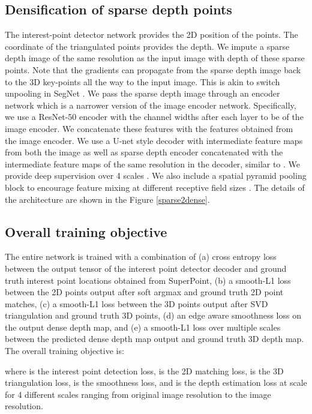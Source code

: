 \documentclass[runningheads]{llncs}
\begin{document}
\subsection{Densification of sparse depth points}
The interest-point detector network provides the 2D position of the points. The  coordinate of the triangulated points provides the depth. We impute a sparse depth image of the same resolution as the input image with  depth of these sparse points. Note that the gradients can propagate from the sparse depth image back to the 3D key-points all the way to the input image. This is akin to switch unpooling in SegNet \cite{badrinarayanan2015segnet}. We pass the sparse depth image through an encoder network which is a narrower version of the image encoder network. Specifically, we use a ResNet-50 encoder with the channel widths after each layer to be  of the image encoder. We concatenate these features with the features obtained from the image encoder. We use a U-net style decoder with intermediate feature maps from both the image as well as sparse depth encoder concatenated with the intermediate feature maps of the same resolution in the decoder, similar to  \cite{chen2018estimating}. We provide deep supervision over 4 scales \cite{lee2015deeply}. We also include a spatial pyramid pooling block to encourage feature mixing at different receptive field sizes \cite{he2015spatial,chen2017rethinking}. The details of the architecture are shown in the Figure \ref{sparse2dense}. 

\subsection{Overall training objective}
The entire network is trained with a combination of (a) cross entropy loss between the output tensor of the interest point detector decoder and ground truth interest point locations obtained from SuperPoint, (b) a smooth-L1 loss between the 2D points output after soft argmax and ground truth 2D point matches, (c) a smooth-L1 loss between the 3D points output after SVD triangulation and ground truth 3D points, (d) an edge aware smoothness loss on the output dense depth map, and (e) a smooth-L1 loss over multiple scales between the predicted dense depth map output and ground truth 3D depth map. The overall training objective is: 


where  is the interest point detection loss,  is the 2D matching loss,  is the 3D triangulation loss,  is the smoothness loss, and  is the depth estimation loss at scale  for 4 different scales ranging from original image resolution to  the image resolution. 
\end{document}

